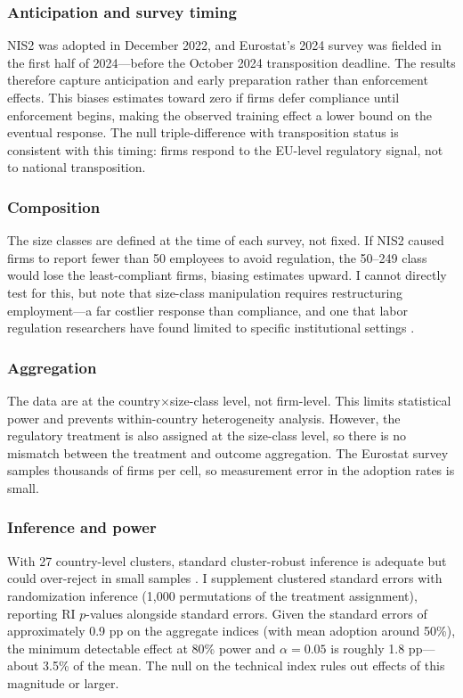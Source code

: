 \documentclass[12pt]{article}
\begin{document}
\subsubsection*{Anticipation and survey timing} NIS2 was adopted in December 2022, and Eurostat's 2024 survey was fielded in the first half of 2024---before the October 2024 transposition deadline. The results therefore capture anticipation and early preparation rather than enforcement effects. This biases estimates toward zero if firms defer compliance until enforcement begins, making the observed training effect a lower bound on the eventual response. The null triple-difference with transposition status is consistent with this timing: firms respond to the EU-level regulatory signal, not to national transposition.

\subsubsection*{Composition} The size classes are defined at the time of each survey, not fixed. If NIS2 caused firms to report fewer than 50 employees to avoid regulation, the 50--249 class would lose the least-compliant firms, biasing estimates upward. I cannot directly test for this, but note that size-class manipulation requires restructuring employment---a far costlier response than compliance, and one that labor regulation researchers have found limited to specific institutional settings \citep{garicano2016firm}.

\subsubsection*{Aggregation} The data are at the country$\times$size-class level, not firm-level. This limits statistical power and prevents within-country heterogeneity analysis. However, the regulatory treatment is also assigned at the size-class level, so there is no mismatch between the treatment and outcome aggregation. The Eurostat survey samples thousands of firms per cell, so measurement error in the adoption rates is small.

\subsubsection*{Inference and power} With 27 country-level clusters, standard cluster-robust inference is adequate but could over-reject in small samples \citep{roodman2019fast}. I supplement clustered standard errors with randomization inference (1,000 permutations of the treatment assignment), reporting RI $p$-values alongside standard errors. Given the standard errors of approximately 0.9 pp on the aggregate indices (with mean adoption around 50\%), the minimum detectable effect at 80\% power and $\alpha = 0.05$ is roughly 1.8 pp---about 3.5\% of the mean. The null on the technical index rules out effects of this magnitude or larger.
\end{document}
